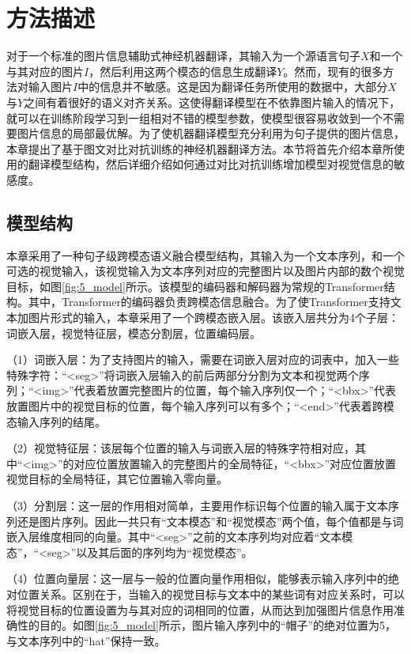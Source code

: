 \section{方法描述}
\label{sec:5_method}

对于一个标准的图片信息辅助式神经机器翻译，其输入为一个源语言句子$X$和一个与其对应的图片$I$，然后利用这两个模态的信息生成翻译$Y$。然而，现有的很多方法对输入图片$I$中的信息并不敏感。这是因为翻译任务所使用的数据中，大部分$X$与$Y$之间有着很好的语义对齐关系。这使得翻译模型在不依靠图片输入的情况下，就可以在训练阶段学习到一组相对不错的模型参数，使模型很容易收敛到一个不需要图片信息的局部最优解。为了使机器翻译模型充分利用为句子提供的图片信息，本章提出了基于图文对比对抗训练的神经机器翻译方法。本节将首先介绍本章所使用的翻译模型结构，然后详细介绍如何通过对比对抗训练增加模型对视觉信息的敏感度。

\subsection{模型结构}
\label{sec:5_architecture}

本章采用了一种句子级跨模态语义融合模型结构，其输入为一个文本序列，和一个可选的视觉输入，该视觉输入为文本序列对应的完整图片以及图片内部的数个视觉目标，如图\ref{fig:5_model}所示。该模型的编码器和解码器为常规的Transformer结构。其中，Transformer的编码器负责跨模态信息融合。为了使Transformer支持文本加图片形式的输入，本章采用了一个跨模态嵌入层。该嵌入层共分为4个子层：词嵌入层，视觉特征层，模态分割层，位置编码层。

（1）{\sffamily 词嵌入层：}为了支持图片的输入，需要在词嵌入层对应的词表中，加入一些特殊字符：“<seg>”将词嵌入层输入的前后两部分分割为文本和视觉两个序列；“<img>”代表着放置完整图片的位置，每个输入序列仅一个；“<bbx>”代表放置图片中的视觉目标的位置，每个输入序列可以有多个；“<end>”代表着跨模态输入序列的结尾。


（2）{\sffamily 视觉特征层：}该层每个位置的输入与词嵌入层的特殊字符相对应，其中“<img>”的对应位置放置输入的完整图片的全局特征，“<bbx>”对应位置放置视觉目标的全局特征，其它位置输入零向量。


（3）{\sffamily 分割层：}这一层的作用相对简单，主要用作标识每个位置的输入属于文本序列还是图片序列。因此一共只有“文本模态”和“视觉模态”两个值，每个值都是与词嵌入层维度相同的向量。其中“<seg>”之前的文本序列均对应着“文本模态”，“<seg>”以及其后面的序列均为“视觉模态”。


（4）{\sffamily 位置向量层：}这一层与一般的位置向量作用相似，能够表示输入序列中的绝对位置关系。区别在于，当输入的视觉目标与文本中的某些词有对应关系时，可以将视觉目标的位置设置为与其对应的词相同的位置，从而达到加强图片信息作用准确性的目的。如图\ref{fig:5_model}所示，图片输入序列中的“帽子”的绝对位置为5，与文本序列中的“hat”保持一致。

